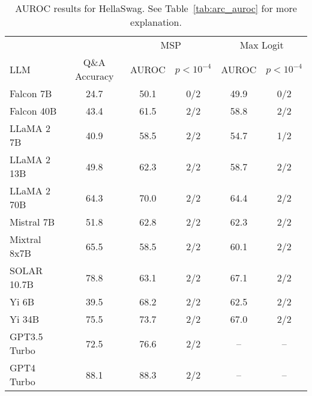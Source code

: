 \begin{table*}[!h]
\centering
\caption{AUROC results for HellaSwag. See Table~\ref{tab:arc_auroc} for more explanation.}
\label{tab:hellaswag_auroc}
\begin{tabular}{lccccc}
\toprule
& & \multicolumn{2}{c}{MSP} & \multicolumn{2}{c}{Max Logit} \\ 
LLM & Q\&A Accuracy & AUROC & $p < 10^{-4}$ & AUROC & $p < 10^{-4}$\\ 
\cmidrule(lr){1-1} \cmidrule(lr){2-2} \cmidrule(lr){3-4} \cmidrule(lr){5-6}
Falcon 7B & 24.7 & 50.1 & 0/2 & 49.9 & 0/2 \\
Falcon 40B & 43.4 & 61.5 & 2/2 & 58.8 & 2/2 \\
LLaMA 2 7B & 40.9 & 58.5 & 2/2 & 54.7 & 1/2 \\
LLaMA 2 13B & 49.8 & 62.3 & 2/2 & 58.7 & 2/2\\
LLaMA 2 70B & 64.3 & 70.0 & 2/2 & 64.4 & 2/2\\
Mistral 7B & 51.8 & 62.8 & 2/2 & 62.3 & 2/2\\
Mixtral 8x7B & 65.5 & 58.5 & 2/2 & 60.1 & 2/2\\
SOLAR 10.7B & 78.8 & 63.1 & 2/2 & 67.1 & 2/2\\
Yi 6B & 39.5 & 68.2 & 2/2 & 62.5 & 2/2\\
Yi 34B & 75.5 & 73.7 & 2/2 & 67.0 & 2/2\\
GPT3.5 Turbo & 72.5 & 76.6 & 2/2 & -- & -- \\
GPT4 Turbo & 88.1 & 88.3 & 2/2 & -- & -- \\
\bottomrule
\end{tabular}
\end{table*}


